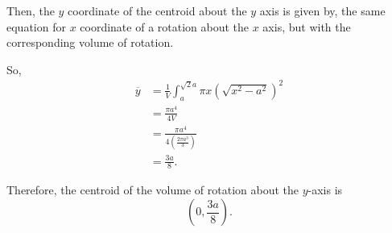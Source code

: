 \documentclass[../hw8]{subfiles}
\begin{document}
Then, the $y$ coordinate of the centroid about the $y$ axis is given by, the same equation for $x$ coordinate of a rotation about the $x$ axis, but with the corresponding volume of rotation.

So, 
\begin{align*}
    \overline{y} &= \frac{1}{V}\int_{a}^{\sqrt{2}a} \pi x {\left( \sqrt{x^2-a^2} \right)}^2 \\
    &= \frac{\pi a^4}{4V} \\
    &= \frac{\pi a^4}{4\left( \frac{2\pi a^3}{3} \right)} \\
    &= \frac{3a}{8}.
\end{align*}

Therefore, the centroid of the volume of rotation about the $y$-axis is \[\left( 0,\frac{3a}{8} \right).\]
\end{document}

